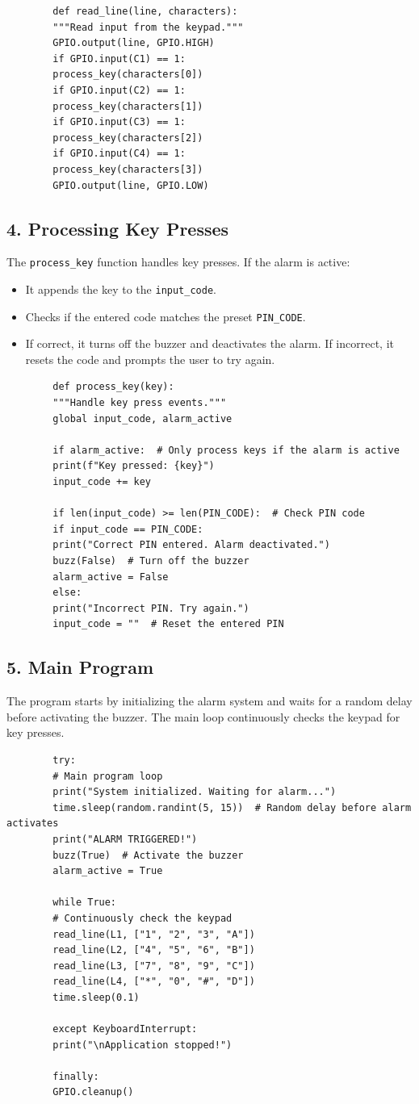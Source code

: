 \documentclass{article}
\begin{document}
	\begin{lstlisting}
		def read_line(line, characters):
		"""Read input from the keypad."""
		GPIO.output(line, GPIO.HIGH)
		if GPIO.input(C1) == 1:
		process_key(characters[0])
		if GPIO.input(C2) == 1:
		process_key(characters[1])
		if GPIO.input(C3) == 1:
		process_key(characters[2])
		if GPIO.input(C4) == 1:
		process_key(characters[3])
		GPIO.output(line, GPIO.LOW)
	\end{lstlisting}
	
	\subsection*{4. Processing Key Presses}
	The \texttt{process\_key} function handles key presses. If the alarm is active:
	\begin{itemize}
		\item It appends the key to the \texttt{input\_code}.
		\item Checks if the entered code matches the preset \texttt{PIN\_CODE}.
		\item If correct, it turns off the buzzer and deactivates the alarm. If incorrect, it resets the code and prompts the user to try again.
	\end{itemize}
	
	\begin{lstlisting}
		def process_key(key):
		"""Handle key press events."""
		global input_code, alarm_active
		
		if alarm_active:  # Only process keys if the alarm is active
		print(f"Key pressed: {key}")
		input_code += key
		
		if len(input_code) >= len(PIN_CODE):  # Check PIN code
		if input_code == PIN_CODE:
		print("Correct PIN entered. Alarm deactivated.")
		buzz(False)  # Turn off the buzzer
		alarm_active = False
		else:
		print("Incorrect PIN. Try again.")
		input_code = ""  # Reset the entered PIN
	\end{lstlisting}
	
	\subsection*{5. Main Program}
	The program starts by initializing the alarm system and waits for a random delay before activating the buzzer. The main loop continuously checks the keypad for key presses.
	
	\begin{lstlisting}
		try:
		# Main program loop
		print("System initialized. Waiting for alarm...")
		time.sleep(random.randint(5, 15))  # Random delay before alarm activates
		print("ALARM TRIGGERED!")
		buzz(True)  # Activate the buzzer
		alarm_active = True
		
		while True:
		# Continuously check the keypad
		read_line(L1, ["1", "2", "3", "A"])
		read_line(L2, ["4", "5", "6", "B"])
		read_line(L3, ["7", "8", "9", "C"])
		read_line(L4, ["*", "0", "#", "D"])
		time.sleep(0.1)
		
		except KeyboardInterrupt:
		print("\nApplication stopped!")
		
		finally:
		GPIO.cleanup()
	\end{lstlisting}
	
\end{document}
